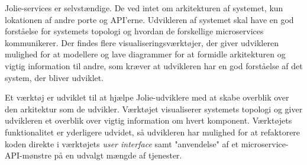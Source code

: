 Jolie-services er selvstændige. De ved intet om arkitekturen af systemet, kun lokationen af andre porte og API'erne.
Udvikleren af systemet skal have en god forståelse for systemets topologi og hvordan de forskellige microservices kommunikerer.
Der findes flere visualiseringsværktøjer, der giver udvikleren mulighed for at modellere og lave diagrammer for at formidle arkitekturen og vigtig information til andre,
som kræver at udvikleren har en god forståelse af det system, der bliver udviklet.

Et værktøj er udviklet til at hjælpe Jolie-udviklere med at skabe overblik over den arkitektur som de udvikler.
Værktøjet visualiserer systemets topologi og giver udvikleren et overblik over vigtig information om hvert komponent.
Værktøjets funktionalitet er yderligere udvidet, så udvikleren har mulighed for at refaktorere koden direkte i værktøjets \emph{user interface} samt "anvendelse" af et microservice-API-mønstre på en udvalgt mængde af tjenester.
